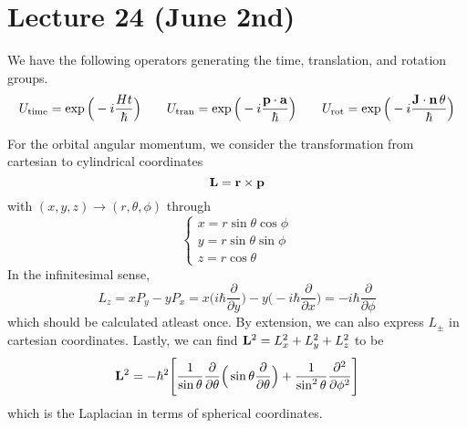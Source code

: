 \section{Lecture 24 (June 2nd)}
\begin{recall}
We have the following operators generating the time, translation, and rotation groups. 
\[U_{\mathrm{time }}=\exp \Big(-i\dfrac{Ht}{\hbar }\Big)\qquad U_{\mathrm{tran}}=\exp \Big(-i\dfrac{{\bf p}\cdot {\bf a}}{\hbar }\Big)\qquad U_{\mathrm{rot}}=\exp \Big(-i\dfrac{{\bf J}\cdot {\bf n}\,\theta }{\hbar }\Big)\]
\end{recall}
\vspace{2ex}
\begin{prop}
For the orbital angular momentum, we consider the transformation from cartesian to cylindrical coordinates
\[{\bf L}={\bf r}\times {\bf p}\]
with $(x,y,z)\rightarrow (r,\theta ,\phi )$ through
\[\begin{cases}
x=r\sin \theta \cos \phi \\
y=r\sin \theta \sin \phi \\
z=r\cos \theta 
\end{cases}\]
In the infinitesimal sense,
\[L_{z}=xP_{y}-yP_{x}=x\Big(i\hbar \dfrac{\partial }{\partial y} \Big)-y\Big(-i\hbar \dfrac{\partial }{\partial x} \Big)=-i\hbar \dfrac{\partial }{\partial \phi } \]
which should be calculated atleast once. By extension, we can also express $L_{\pm}$ in cartesian coordinates. Lastly, we can find ${\bf L}^2=L^{2}_{x}+L^{2}_{y}+L^{2}_{z}$ to be
\[{\bf L}^2=-\hbar ^2\Bigg[\dfrac{1}{\sin \theta }\dfrac{\partial }{\partial \theta }\Big(\sin \theta \dfrac{\partial }{\partial \theta } \Big)+\dfrac{1}{\sin ^2\theta }\dfrac{\partial ^2}{\partial \phi ^2}  \Bigg]\]
which is the Laplacian in terms of spherical coordinates. 
\end{prop}
\vspace{2ex}
